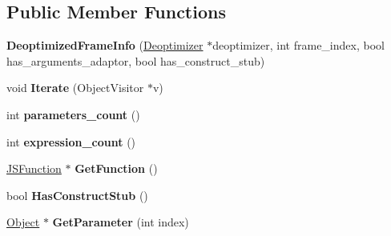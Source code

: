 \subsection*{Public Member Functions}
\begin{DoxyCompactItemize}
\item 
\hypertarget{classv8_1_1internal_1_1_deoptimized_frame_info_a63cf2848fcb2f34abae933c682b67767}{}{\bfseries Deoptimized\+Frame\+Info} (\hyperlink{classv8_1_1internal_1_1_deoptimizer}{Deoptimizer} $\ast$deoptimizer, int frame\+\_\+index, bool has\+\_\+arguments\+\_\+adaptor, bool has\+\_\+construct\+\_\+stub)\label{classv8_1_1internal_1_1_deoptimized_frame_info_a63cf2848fcb2f34abae933c682b67767}

\item 
\hypertarget{classv8_1_1internal_1_1_deoptimized_frame_info_a4f249339b2f63d9239ff3b7891d47956}{}void {\bfseries Iterate} (Object\+Visitor $\ast$v)\label{classv8_1_1internal_1_1_deoptimized_frame_info_a4f249339b2f63d9239ff3b7891d47956}

\item 
\hypertarget{classv8_1_1internal_1_1_deoptimized_frame_info_ace9c74d42d04b117979611044f6adc68}{}int {\bfseries parameters\+\_\+count} ()\label{classv8_1_1internal_1_1_deoptimized_frame_info_ace9c74d42d04b117979611044f6adc68}

\item 
\hypertarget{classv8_1_1internal_1_1_deoptimized_frame_info_a86000b47a892ff78f37787ed131e61c9}{}int {\bfseries expression\+\_\+count} ()\label{classv8_1_1internal_1_1_deoptimized_frame_info_a86000b47a892ff78f37787ed131e61c9}

\item 
\hypertarget{classv8_1_1internal_1_1_deoptimized_frame_info_a6b0f857296fac71ac2e00942ced00c48}{}\hyperlink{classv8_1_1internal_1_1_j_s_function}{J\+S\+Function} $\ast$ {\bfseries Get\+Function} ()\label{classv8_1_1internal_1_1_deoptimized_frame_info_a6b0f857296fac71ac2e00942ced00c48}

\item 
\hypertarget{classv8_1_1internal_1_1_deoptimized_frame_info_a89e933d5994a7a794280d8d56f749369}{}bool {\bfseries Has\+Construct\+Stub} ()\label{classv8_1_1internal_1_1_deoptimized_frame_info_a89e933d5994a7a794280d8d56f749369}

\item 
\hypertarget{classv8_1_1internal_1_1_deoptimized_frame_info_a79ce7962cb7d2bc10af4f59644923643}{}\hyperlink{classv8_1_1internal_1_1_object}{Object} $\ast$ {\bfseries Get\+Parameter} (int index)\label{classv8_1_1internal_1_1_deoptimized_frame_info_a79ce7962cb7d2bc10af4f59644923643}


\end{DoxyCompactItemize}
